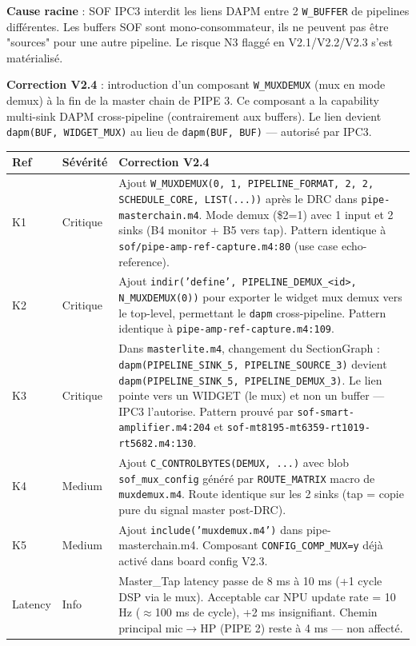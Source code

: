 \documentclass[11pt,a4paper]{article}
\begin{document}
\textbf{Cause racine} : SOF IPC3 interdit les liens DAPM entre 2 \texttt{W\_BUFFER} de pipelines différentes. Les buffers SOF sont mono-consommateur, ils ne peuvent pas être "sources" pour une autre pipeline. Le risque N3 flaggé en V2.1/V2.2/V2.3 s'est matérialisé.

\textbf{Correction V2.4} : introduction d'un composant \texttt{W\_MUXDEMUX} (mux en mode demux) à la fin de la master chain de PIPE 3. Ce composant a la capability multi-sink DAPM cross-pipeline (contrairement aux buffers). Le lien devient \texttt{dapm(BUF, WIDGET\_MUX)} au lieu de \texttt{dapm(BUF, BUF)} --- autorisé par IPC3.

\begin{center}
\begin{tabularx}{\textwidth}{llX}
\toprule
\textbf{Ref} & \textbf{Sévérité} & \textbf{Correction V2.4} \\
\midrule
K1 & Critique & Ajout \texttt{W\_MUXDEMUX(0, 1, PIPELINE\_FORMAT, 2, 2, SCHEDULE\_CORE, LIST(...))} après le DRC dans \texttt{pipe-masterchain.m4}. Mode demux (\$2=1) avec 1 input et 2 sinks (B4 monitor + B5 vers tap). Pattern identique à \texttt{sof/pipe-amp-ref-capture.m4:80} (use case echo-reference). \\
K2 & Critique & Ajout \texttt{indir('define', PIPELINE\_DEMUX\_<id>, N\_MUXDEMUX(0))} pour exporter le widget mux demux vers le top-level, permettant le \texttt{dapm} cross-pipeline. Pattern identique à \texttt{pipe-amp-ref-capture.m4:109}. \\
K3 & Critique & Dans \texttt{masterlite.m4}, changement du SectionGraph : \texttt{dapm(PIPELINE\_SINK\_5, PIPELINE\_SOURCE\_3)} devient \texttt{dapm(PIPELINE\_SINK\_5, PIPELINE\_DEMUX\_3)}. Le lien pointe vers un WIDGET (le mux) et non un buffer --- IPC3 l'autorise. Pattern prouvé par \texttt{sof-smart-amplifier.m4:204} et \texttt{sof-mt8195-mt6359-rt1019-rt5682.m4:130}. \\
K4 & Medium & Ajout \texttt{C\_CONTROLBYTES(DEMUX, ...)} avec blob \texttt{sof\_mux\_config} généré par \texttt{ROUTE\_MATRIX} macro de \texttt{muxdemux.m4}. Route identique sur les 2 sinks (tap = copie pure du signal master post-DRC). \\
K5 & Medium & Ajout \texttt{include('muxdemux.m4')} dans pipe-masterchain.m4. Composant \texttt{CONFIG\_COMP\_MUX=y} déjà activé dans board config V2.3. \\
Latency & Info & Master\_Tap latency passe de 8 ms à 10 ms (+1 cycle DSP via le mux). Acceptable car NPU update rate = 10 Hz ($\approx$100 ms de cycle), +2 ms insignifiant. Chemin principal mic$\rightarrow$HP (PIPE 2) reste à 4 ms --- non affecté. \\
\bottomrule
\end{tabularx}
\end{center}
\end{document}
